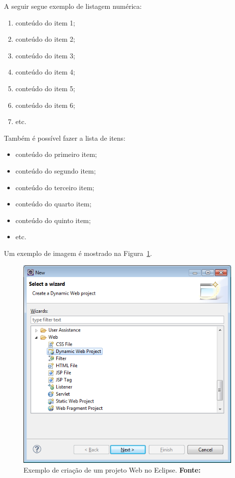 \par A seguir segue exemplo de listagem numérica:

\begin{enumerate}
  \item conteúdo do item 1;
  \item conteúdo do item 2;
  \item conteúdo do item 3;
  \item conteúdo do item 4;
  \item conteúdo do item 5;
  \item conteúdo do item 6;
  \item etc.
\end{enumerate}

\par Também é possível fazer a lista de itens:

\begin{itemize}
  \item conteúdo do primeiro item;
  \item conteúdo do segundo item;
  \item conteúdo do terceiro item;
  \item conteúdo do quarto item;
  \item conteúdo do quinto item;
  \item etc.
\end{itemize}

\par Um exemplo de imagem é mostrado na Figura~\ref{fig:exemplo1}.

\begin{figure}[h!]
  \centerline{\includegraphics[scale=0.65]{./imagens/apendice_img1.png}}
  \caption[Exemplo de criação de um projeto Web no Eclipse]
          {Exemplo de criação de um projeto Web no Eclipse. \textbf{Fonte:} \cite{correa2003plantas}}
\label{fig:exemplo1}
\end{figure}

